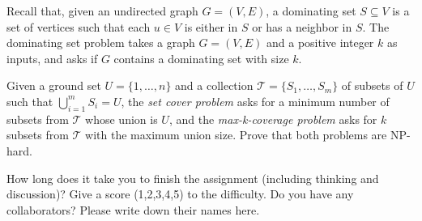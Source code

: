\documentclass{oxmathproblems}
\begin{document}
\begin{questions}
Recall that, given an undirected graph $G=(V,E)$, a dominating set $S\subseteq V$ is a set of vertices such that each $u\in V$ is either in $S$ or has a neighbor in $S$. The dominating set problem takes a graph $G=(V,E)$ and a positive integer $k$ as inputs, and asks if $G$ contains a dominating set with size $k$.


\miquestion[50]
Given a ground set $U=\{1,\ldots,n\}$ and a collection  $\mathcal{T}=\{S_1,\ldots,S_m\}$ of subsets of $U$ such that $\bigcup_{i=1}^mS_i=U$, the \emph{set cover problem} asks for a minimum number of subsets from $\mathcal{T}$ whose union is $U$, and the \emph{max-k-coverage problem} asks for $k$ subsets from $\mathcal{T}$ with the maximum union size.
Prove that both problems are NP-hard.
  
\miquestion
How long does it take you to finish the assignment (including thinking and discussion)?
Give a score (1,2,3,4,5) to the difficulty.
Do you have any collaborators?
Please write down their names here.
 

\end{questions}
\end{document}
